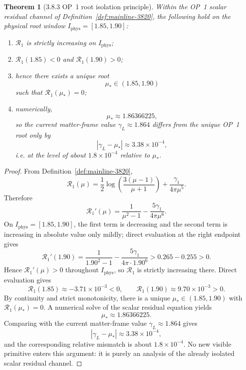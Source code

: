 \documentclass[12pt,a4paper]{article}
\newtheorem{theorem}{Theorem}[section]
\begin{document}
\begin{theorem}[3.8.3 OP~1 root isolation principle]
\label{thm:mainline-3830}
Within the OP~1 scalar residual channel of Definition~\ref{def:mainline-3820}, the following hold on the physical root window \(I_{\mathrm{phys}}=[1.85,1.90]\):
\begin{enumerate}[label=(\roman*), leftmargin=2em]
 \item \(\mathcal R_1\) is strictly increasing on \(I_{\mathrm{phys}}\);
 \item \(\mathcal R_1(1.85)<0\) and \(\mathcal R_1(1.90)>0\);
 \item hence there exists a unique root
 \[
 \mu_\ast\in(1.85,1.90)
 \]
 such that \(\mathcal R_1(\mu_\ast)=0\);
 \item numerically,
 \[
 \mu_\ast \approx 1.86366225,
 \]
 so the current matter-frame value \(\gamma_L\approx 1.864\) differs from the unique OP~1 root only by
 \[
 |\gamma_L-\mu_\ast|\approx 3.38\times 10^{-4},
 \]
 i.e. at the level of about \(1.8\times 10^{-4}\) relative to \(\mu_\ast\).
\end{enumerate}
\end{theorem}

\begin{proof}
From Definition~\ref{def:mainline-3820},
\[
 \mathcal R_1(\mu)=\frac12\log\!\left(\frac{3(\mu-1)}{\mu+1}\right)+\frac{\gamma_1}{4\pi\mu^5}.
\]
Therefore
\[
 \mathcal R_1'(\mu)
 =\frac{1}{\mu^2-1}-\frac{5\gamma_1}{4\pi\mu^6}.
\]
On \(I_{\mathrm{phys}}=[1.85,1.90]\), the first term is decreasing and the second term is increasing in absolute value only mildly; direct evaluation at the right endpoint gives
\[
 \mathcal R_1'(1.90)
 =
 \frac{1}{1.90^2-1}-\frac{5\gamma_1}{4\pi\cdot 1.90^6}
 > 0.265-0.255
 > 0.
\]
Hence \(\mathcal R_1'(\mu)>0\) throughout \(I_{\mathrm{phys}}\), so \(\mathcal R_1\) is strictly increasing there. Direct evaluation gives
\[
 \mathcal R_1(1.85)\approx -3.71\times 10^{-3}<0,
 \qquad
 \mathcal R_1(1.90)\approx 9.70\times 10^{-3}>0.
\]
By continuity and strict monotonicity, there is a unique \(\mu_\ast\in(1.85,1.90)\) with \(\mathcal R_1(\mu_\ast)=0\). A numerical solve of the scalar residual equation yields
\[
 \mu_\ast\approx 1.86366225.
\]
Comparing with the current matter-frame value \(\gamma_L\approx 1.864\) gives
\[
 |\gamma_L-\mu_\ast|\approx 3.38\times 10^{-4},
\]
and the corresponding relative mismatch is about \(1.8\times 10^{-4}\). No new visible primitive enters this argument: it is purely an analysis of the already isolated scalar residual channel.
\end{proof}
\end{document}
